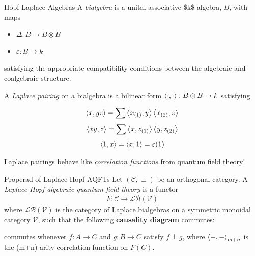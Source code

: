 \documentclass[presentation]{beamer}
\begin{document}
\begin{frame}[label={sec:org447bf1d},fragile]{Hopf-Laplace Algebras}
 A \emph{bialgebra} is a unital associative \$k\$-algebra, \(B\), with maps 

\medskip

\begin{itemize}
\item {} \(\Delta: B \to B \otimes B\)

\item {} \(\varepsilon: B \to k\)
\end{itemize}

\bigskip

satisfying the appropriate compatibility conditions between the algebraic and coalgebraic structure.

A \emph{Laplace pairing} on a bialgebra is a bilinear form \(\left\langle \cdot, \cdot \right\rangle: B \otimes B \to k\) satisfying

\[
\left\langle x, yz \right\rangle = \sum \left\langle x_{(1)}, y \right\rangle \left\langle x_{(2)}, z \right\rangle
\]
\[
\left\langle xy, z \right\rangle = \sum \left\langle x, z_{(1)} \right\rangle \left\langle y, z_{(2)} \right\rangle
\]
\[
\left\langle 1, x \right\rangle = \left\langle x, 1 \right\rangle = \varepsilon(1)
\]

 Laplace pairings behave like \emph{correlation functions} from quantum field theory!
\end{frame}
\begin{frame}[label={sec:org0338129}]{Properad of Laplace Hopf AQFTs}
Let \((\mathcal{C}, \perp)\) be an orthogonal category. A \emph{Laplace Hopf algebraic quantum field theory} is a functor
\begin{align*}
F: \mathcal{C} \to \mathcal{LB}(\mathcal{V})
\end{align*}
where \(\mathcal{LB}(\mathcal{V})\) is the category of Laplace bialgebras on a symmetric monoidal category \(\mathcal{V}\), such that the following \textbf{causality diagram} commutes:

\begin{center}
\end{center}
commutes whenever \(f: A \to C\) and \(g: B \to C\) satisfy \(f \perp g\), where \(\left\langle -,- \right\rangle_{m+n}\) is the (m+n)-arity correlation function on \(F(C)\).
\end{frame}
\end{document}
